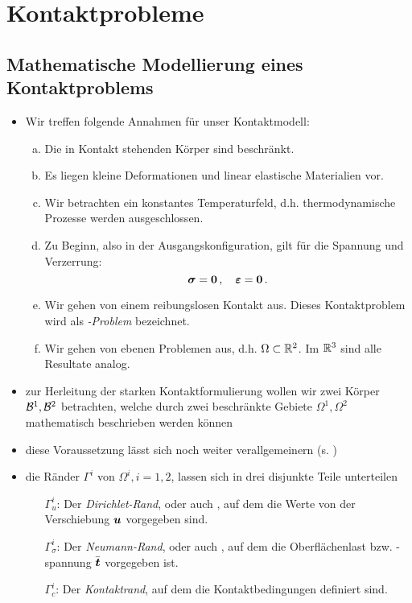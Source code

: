 \section{Kontaktprobleme}
\label{kap:3.2}

\subsection{Mathematische Modellierung eines Kontaktproblems}
\label{kap:3.2.1}

\begin{itemize}
\item 
\begin{vor}
Wir treffen folgende Annahmen für unser Kontaktmodell:
\begin{enumerate}[(a)]
\item Die in Kontakt stehenden Körper sind beschränkt.
\item Es liegen kleine Deformationen und linear elastische Materialien vor.
\item Wir betrachten ein konstantes Temperaturfeld, d.h. thermodynamische Prozesse werden ausgeschlossen.
\item Zu Beginn, also in der Ausgangskonfiguration, gilt für die Spannung und Verzerrung: 
\[
	\boldsymbol \sigma = \boldsymbol 0\, , \quad \boldsymbol {\varepsilon} =\boldsymbol 0 \, .
\]
\item Wir gehen von einem reibungslosen Kontakt aus. Dieses Kontaktproblem wird als \textit{-Problem} bezeichnet.
\item Wir gehen von ebenen Problemen aus, d.h. $\Omega \subset \mathbb{R}^2$. Im $\mathbb{R}^3$ sind alle Resultate analog.
\end{enumerate}
\end{vor}

\item zur Herleitung der starken Kontaktformulierung wollen wir zwei Körper $\mathcal B^1, \mathcal B^2$ betrachten, welche durch zwei beschränkte Gebiete $\Omega^1, \Omega^2$ mathematisch beschrieben werden können

\item diese Voraussetzung lässt sich noch weiter verallgemeinern (s. \cite{CarWri})

\item die Ränder $\Gamma^i$ von $\Omega^i, i = 1,2$, lassen sich in drei disjunkte Teile unterteilen
\begin{enumerate}
\item[$\Gamma^i_u$:] Der \textit{Dirichlet-Rand}, oder auch \textit{}, auf dem die Werte von der Verschiebung $\boldsymbol u$ vorgegeben sind.
\item[$\Gamma^i_\sigma$:] Der \textit{Neumann-Rand}, oder auch \textit{}, auf dem die Oberflächenlast bzw. -spannung $\bar{\boldsymbol t}$ vorgegeben ist.
\item[$\Gamma^i_c$:] Der \textit{Kontaktrand}, auf dem die Kontaktbedingungen definiert sind.
\end{enumerate}


\end{itemize}
